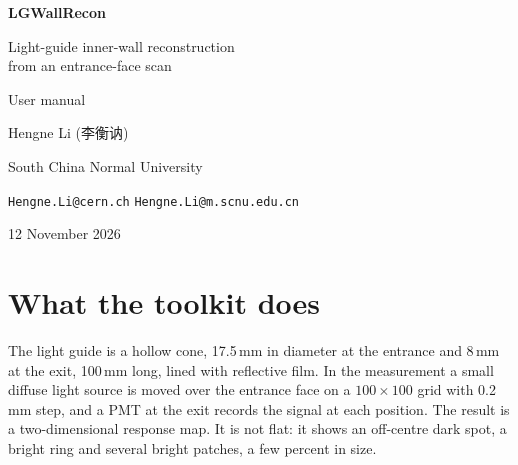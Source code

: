 \documentclass[11pt,a4paper]{article}
\newcommand{\code}[1]{\texttt{#1}}
\begin{document}
\begin{titlepage}
\vspace*{2.5cm}
{\Huge\bfseries LGWallRecon\par}
\vspace{0.5cm}
{\LARGE Light-guide inner-wall reconstruction\\[2pt] from an entrance-face scan\par}
\vspace{0.9cm}
{\Large User manual\par}
\vspace{2.2cm}
{\large Hengne Li (李衡讷)\par}
\vspace{4pt}
South China Normal University\par
\vspace{4pt}
\code{Hengne.Li@cern.ch} \quad \code{Hengne.Li@m.scnu.edu.cn}\par
\vspace{1.2cm}
12 November 2026\par
\vfill
{}
\end{titlepage}

\tableofcontents
\newpage

\section{What the toolkit does}

The light guide is a hollow cone, 17.5\,mm in diameter at the entrance and 8\,mm at the exit,
100\,mm long, lined with reflective film. In the measurement a small diffuse light source is moved
over the entrance face on a $100\times100$ grid with 0.2\,mm step, and a PMT at the exit records the
signal at each position. The result is a two-dimensional response map. It is not flat: it shows an
off-centre dark spot, a bright ring and several bright patches, a few percent in size.
\end{document}
